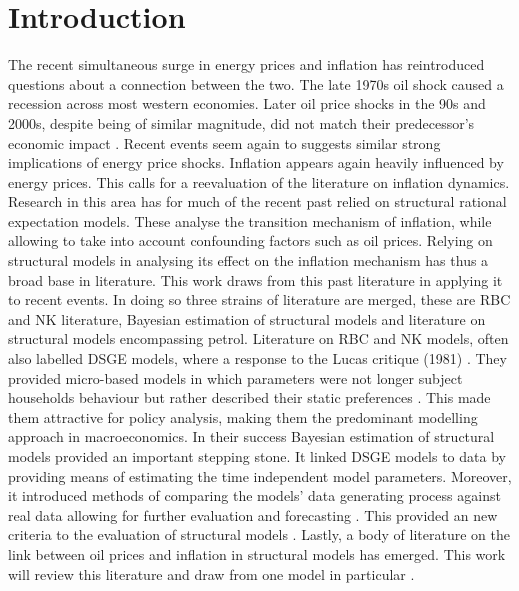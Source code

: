 \documentclass[12pt,a4paper,english]{article} %
\let\oldsection\section
\renewcommand\section{\clearpage\oldsection}
\begin{document}
	 \section{Introduction}
	 The recent simultaneous surge in energy prices and inflation has reintroduced questions about a connection between the two. The late 1970s oil shock caused a recession across most western economies. Later oil price shocks in the 90s and 2000s, despite being of similar magnitude, did not match their predecessor's economic impact \cite{blanchard_macroeconomic_2007}. Recent events seem again to suggests similar strong implications of energy price shocks. Inflation appears again heavily influenced by energy prices. This calls for a reevaluation of the literature on inflation dynamics. Research in this area has for much of the recent past relied on structural rational expectation models. These analyse the transition mechanism of inflation, while allowing to take into account confounding factors such as oil prices. Relying on structural models in analysing its effect on the inflation mechanism has thus a broad base in literature. This work draws from this past literature in applying it to recent events. In doing so three strains of literature are merged, these are \ac{RBC} and \ac{NK} literature, Bayesian estimation of structural models and literature on structural models encompassing petrol. Literature on \ac{RBC} and \ac{NK} models, often also labelled \ac{DSGE} models,  where a response to the Lucas critique (1981) \cite{lucas_jr_tobin_1981}. They provided micro-based models in which parameters were not longer subject households behaviour but rather described their static preferences \cite{gali_monetary_2008}. This made them attractive for policy analysis, making them the predominant modelling approach in macroeconomics. In their success Bayesian estimation of structural models provided an important stepping stone. It linked \ac{DSGE} models to data by providing means of estimating the time independent model parameters. Moreover, it introduced methods of comparing the models' data generating process against real data allowing for further evaluation and forecasting \cite{del_negro_forming_2008}. This provided an new criteria to the evaluation of structural models \cite{kocherlakota_model_2007}. Lastly, a body of literature on the link between oil prices and inflation in structural models has emerged. This work will review this literature and draw from one model in particular \cite{blanchard_macroeconomic_2007}. 
	 
\end{document}
